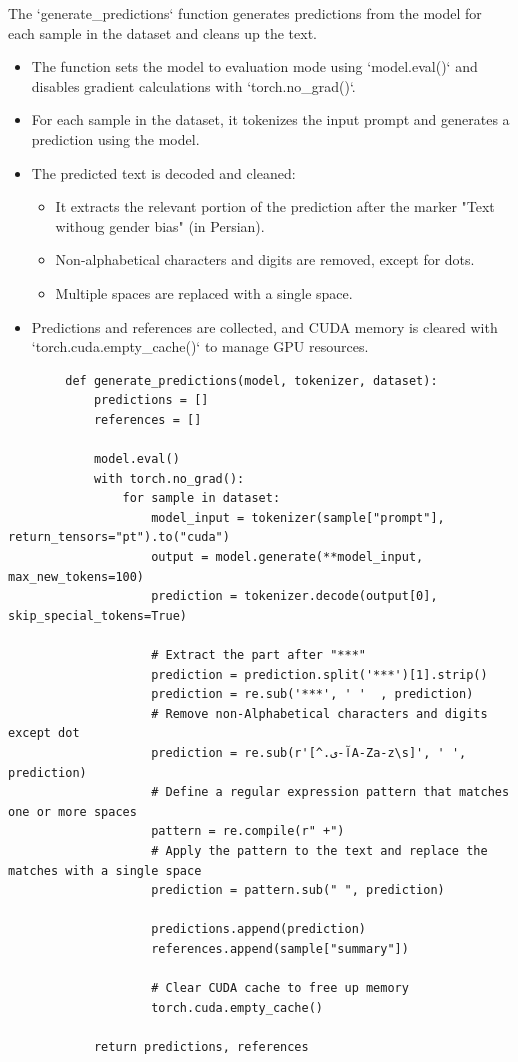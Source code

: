 \documentclass{solutionclass} %
\begin{document}
\begin{solution}
	The `generate\_predictions` function generates predictions from the model for each sample in the dataset and cleans up the text.
	
	\begin{itemize}
		\item The function sets the model to evaluation mode using `model.eval()` and disables gradient calculations with `torch.no\_grad()`.
		\item For each sample in the dataset, it tokenizes the input prompt and generates a prediction using the model.
		\item The predicted text is decoded and cleaned:
		\begin{itemize}
			\item It extracts the relevant portion of the prediction after the marker "Text withoug gender bias" (in Persian).
			\item Non-alphabetical characters and digits are removed, except for dots.
			\item Multiple spaces are replaced with a single space.
		\end{itemize}
		\item Predictions and references are collected, and CUDA memory is cleared with `torch.cuda.empty\_cache()` to manage GPU resources.
	\end{itemize}
	\begin{lstlisting}
		def generate_predictions(model, tokenizer, dataset):
			predictions = []
			references = []
		
			model.eval()
			with torch.no_grad():
				for sample in dataset:
					model_input = tokenizer(sample["prompt"], return_tensors="pt").to("cuda")
					output = model.generate(**model_input, max_new_tokens=100)
					prediction = tokenizer.decode(output[0], skip_special_tokens=True)
					
					# Extract the part after "***"
					prediction = prediction.split('***')[1].strip()
					prediction = re.sub('***', ' '  , prediction)
					# Remove non-Alphabetical characters and digits except dot
					prediction = re.sub(r'[^.آ-یA-Za-z\s]', ' ', prediction)
					# Define a regular expression pattern that matches one or more spaces
					pattern = re.compile(r" +")
					# Apply the pattern to the text and replace the matches with a single space
					prediction = pattern.sub(" ", prediction)
					
					predictions.append(prediction)
					references.append(sample["summary"])
					
					# Clear CUDA cache to free up memory
					torch.cuda.empty_cache()
		
			return predictions, references
		\end{lstlisting}
\end{solution}
\end{document}
